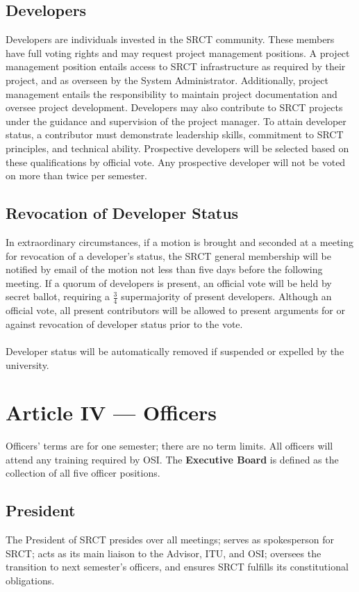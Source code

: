 \documentclass{article}
\begin{document}
  \subsection{Developers}
  Developers are individuals invested in the SRCT community. These 
  members have full voting rights and may request project management 
  positions. A project management position entails access to SRCT 
  infrastructure as required by their project, and as overseen by the
  System Administrator. Additionally, project management entails the
  responsibility to maintain project documentation and oversee project
  development. Developers may also contribute to SRCT projects under 
  the guidance and supervision of the project manager. To attain 
  developer status, a contributor must demonstrate leadership skills, 
  commitment to SRCT principles, and technical ability. Prospective 
  developers will be selected based on these qualifications by official 
  vote. Any prospective developer will not be voted on more than twice 
  per semester.
  
  \subsection{Revocation of Developer Status}
  In extraordinary circumstances, if a motion is brought and seconded at 
  a meeting for revocation of a developer's status, the SRCT general membership
  will be notified by email of the motion not less than five days before the
  following meeting. If a quorum of developers is present, an official vote 
  will be held by secret ballot, requiring a $\frac{3}{4}$ supermajority of 
  present developers. Although an official vote, all present contributors will
  be allowed to present arguments for or against revocation of developer
  status prior to the vote. 
  \\ \\
  Developer status will be automatically removed if suspended or expelled by 
  the university.
  
  \section{Article IV --- Officers}
  Officers' terms are for one semester; there are no term limits. All 
  officers will attend any training required by OSI. The 
  \textbf{Executive Board} is defined as the collection of all five
  officer positions.
  
  \subsection{President}
  The President of SRCT presides over all meetings; serves as 
  spokesperson for SRCT; acts as its main liaison to the Advisor, ITU, 
  and OSI; oversees the transition to next semester's officers, and 
  ensures SRCT fulfills its constitutional obligations.
  
\end{document}

